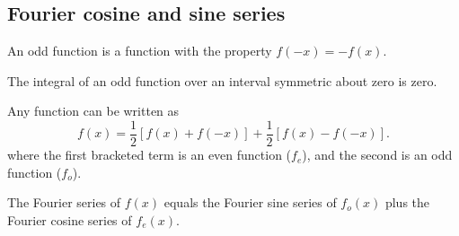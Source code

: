 \documentclass{article}
\begin{document}
\subsection{Fourier cosine and sine series}
\begin{definition}
	An odd function is a function with the property \(f(-x)=-f(x)\).
\end{definition}
\begin{proposition}
	The integral of an odd function over an interval symmetric about zero is zero.
\end{proposition}
\begin{proposition}
	Any function can be written as
	\begin{equation*}
		f(x)=\frac{1}{2}[f(x)+f(-x)]+\frac{1}{2}[f(x)-f(-x)].
	\end{equation*}
	where the first bracketed term is an even function (\(f_e\)), and the second is an odd function (\(f_o\)).
\end{proposition}
\begin{lemma}
	The Fourier series of \(f(x)\) equals the Fourier sine series of \(f_o(x)\) plus the Fourier cosine series of \(f_e(x)\).
\end{lemma}
\end{document}
